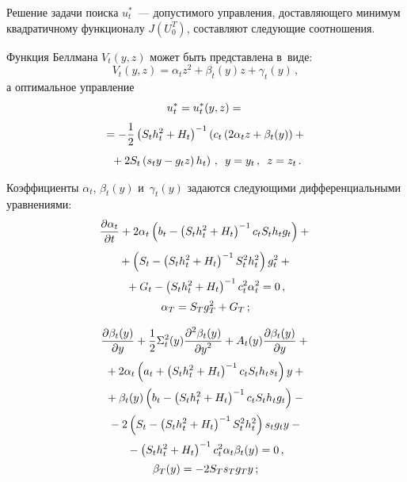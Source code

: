 \begin{multicols}{2}
     Решение задачи поиска $u_t^*$~--- допустимого управ\-ле\-ния, 
доставляющего минимум квадратичному функционалу $J(U_0^T)$, 
составляют следующие соотношения.
     
     Функция Беллмана $V_t(y,z)$ может быть пред\-став\-ле\-на в~виде:
     \begin{equation*}
     V_t(y,z)=\alpha_t z^2+\beta_t(y) z+\gamma_t(y)\,,
     \end{equation*}
а оптимальное управление
\begin{multline}
u_t^* =u_t^*(y,z)={}\\[2pt]
{}=-\displaystyle\frac{\displaystyle 1\mathstrut}{\displaystyle 2\mathstrut}\left( S_th_t^2+H_t\right)^{-1}\left( c_t \left(
2\alpha_t z+\beta_t(y)\right)+{}\right.\\[2pt]
\left.{}+2S_t \left( s_t y-g_t z\right) h_t\right)\,,\enskip
y=y_t\,,\enskip z=z_t\,.
\label{e5-b}
\end{multline}
     
     Коэффициенты $\alpha_t$, $\beta_t(y)$ и~$\gamma_t(y)$ задаются 
следующими дифференциальными уравнениями:
     \begin{multline}
     \displaystyle\frac{\displaystyle \partial \alpha_t\mathstrut}{\displaystyle \partial t\mathstrut}+
2\alpha_t
     \left( b_t-\left( S_t h_t^2+H_t\right)^{-1} c_t S_t h_t g_t\right)+{}\\[2pt]
     {}+\left( S_t-\left( S_t h_t^2+H_t\right)^{-1} S_t^2 h_t^2\right) g_t^2+{}\\[2pt]
     {}+G_t-
     \left( S_t h_t^2+H_t\right)^{-1} c_t^2 \alpha_t^2=0\,,\\[2pt]
     \alpha_T=S_T g_T^2+G_T\,;
     \label{e6-b}
     \end{multline}

\vspace*{-12pt}

\noindent
\begin{multline}
\displaystyle\frac{\displaystyle \partial \beta_t(y)\mathstrut}{\displaystyle \partial y\mathstrut}+\displaystyle\frac{\displaystyle 1\mathstrut}{\displaystyle 2\mathstrut}\Sigma_t^2(y)
\displaystyle\frac{\displaystyle \partial^2\beta_t(y)\mathstrut}{\displaystyle \partial y^2\mathstrut} 
+A_t(y)\displaystyle\frac{\displaystyle \partial \beta_t(y)\mathstrut}{\displaystyle \partial y\mathstrut}+{}\\[2pt]
{}+2\alpha_t\left( a_t+\left( S_t h_t^2+H_t\right)^{-1} c_t S_t h_t 
s_t\right)y+{}\\[2pt]
{}+\beta_t(y) \left( b_t-\left( S_t h_t^2+H_t\right)^{-1} c_t S_t h_t 
g_t\right)-{}\\[2pt]
{}-2\left( S_t-\left( S_t h_t^2+H_t\right)^{-1} S_t^2 h_t^2\right) s_t g_t y-{}\\[2pt]
{}-\left( 
S_t h_t^2+H_t\right)^{-1} c_t^2 \alpha_t \beta_t(y)=0\,,\\[2pt]
\beta_T(y)=-2S_T s_T g_T y\,;
\label{e7-b}
\end{multline}


\end{multicols}
